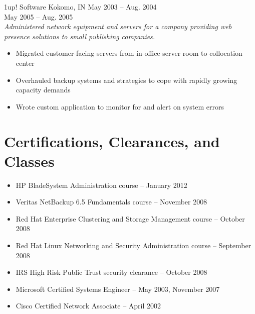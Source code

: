 \documentclass[9pt]{extarticle} %
\begin{document}


\begin{indented}
	1up! Software \tab Kokomo, IN \tab May 2003 -- Aug. 2004\\
	\tab \tab May 2005 -- Aug. 2005\\
	\textit{Administered network equipment and servers for a company providing web presence solutions to small publishing companies.}
	\begin{itemize}
		\item Migrated customer-facing servers from in-office server room to collocation center
		\item Overhauled backup systems and strategies to cope with rapidly growing capacity demands
		\item Wrote custom application to monitor for and alert on system errors
	\end{itemize}
\end{indented}


\section{Certifications, Clearances, and Classes}

\begin{indented}
	\begin{itemize}
		\item HP BladeSystem Administration course -- January 2012
		\item Veritas NetBackup 6.5 Fundamentals course -- November 2008
		\item Red Hat Enterprise Clustering and Storage Management course -- October 2008
		\item Red Hat Linux Networking and Security Administration course -- September 2008
		\item IRS High Risk Public Trust security clearance -- October 2008
		\item Microsoft Certified Systems Engineer -- May 2003, November 2007
		\item Cisco Certified Network Associate -- April 2002
	\end{itemize}
\end{indented}
\end{document}
